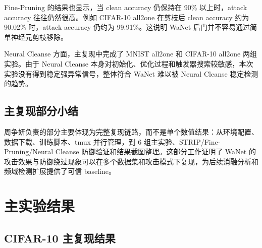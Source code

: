 \documentclass[UTF8,zihao=-4]{ctexart}
\begin{document}
Fine-Pruning 的结果也显示，当 clean accuracy 仍保持在 90\% 以上时，attack accuracy 往往仍然很高。例如 CIFAR-10 all2one 在剪枝后 clean accuracy 约为 90.02\% 时，attack accuracy 仍约为 99.91\%。这说明 WaNet 后门并不容易通过简单神经元剪枝移除。

\begin{table}[H]
\centering
\caption{Fine-Pruning 防御结果摘要}
\label{tab:fp_main}
\end{table}

Neural Cleanse 方面，主复现中完成了 MNIST all2one 和 CIFAR-10 all2one 两组实验。由于 Neural Cleanse 本身对初始化、优化过程和触发器搜索较敏感，本次实验没有得到稳定强异常信号，整体符合 WaNet 难以被 Neural Cleanse 稳定检测的趋势。

\subsection{主复现部分小结}

周争妍负责的部分主要体现为完整复现链路，而不是单个数值结果：从环境配置、数据下载、训练脚本、tmux 并行管理，到 6 组主实验、STRIP/Fine-Pruning/Neural Cleanse 防御验证和结果截图整理。这部分工作证明了 WaNet 的攻击效果与防御绕过现象可以在多个数据集和攻击模式下复现，为后续消融分析和频域检测扩展提供了可信 baseline。

\section{主实验结果}

\subsection{CIFAR-10 主复现结果}
\end{document}
